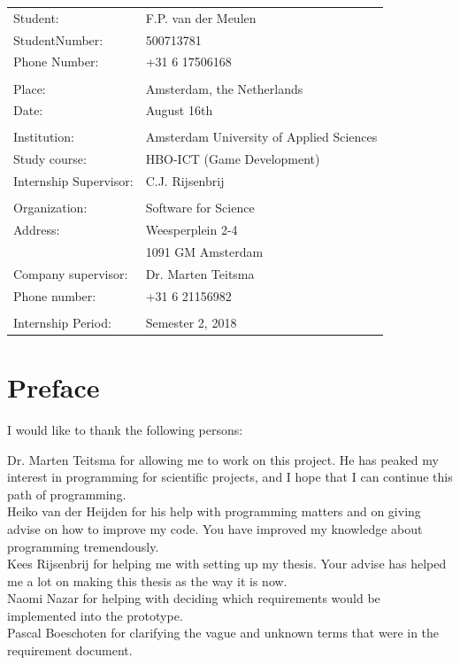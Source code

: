 \documentclass[paper=a4, fontsize=11pt,twoside]{scrartcl}	%
\begin{document}
\newpage 
\begin{longtable}{  p{8cm}  p{8cm} }
Student: & F.P. van der Meulen \\
StudentNumber: & 500713781 \\
Phone Number: & +31 6 17506168 \\
\\
Place: & Amsterdam, the Netherlands \\
Date: & August 16th \\
\\
Institution: & Amsterdam University of Applied Sciences \\
Study course: & HBO-ICT (Game Development) \\
Internship Supervisor: & C.J. Rijsenbrij \\
\\
Organization: & Software for Science \\
Address: & Weesperplein 2-4 \\
 & 1091 GM Amsterdam \\
Company supervisor: & Dr. Marten Teitsma \\
Phone number: & +31 6 21156982\\
\\
Internship Period: & Semester 2, 2018 

\end{longtable}
\newpage



\newpage
\tableofcontents

\newpage
\section*{Preface}
I would like to thank the following persons:

Dr. Marten Teitsma for allowing me to work on this project. He has peaked my interest in programming for scientific projects, and I hope that I can continue this path of programming.\\
Heiko van der Heijden for his help with programming matters and on giving advise on how to improve my code. You have improved my knowledge about programming tremendously. \\
Kees Rijsenbrij for helping me with setting up my thesis. Your advise has helped me a lot on making this thesis as the way it is now. \\
Naomi Nazar for helping with deciding which requirements would be implemented into the prototype. \\
Pascal Boeschoten for clarifying the vague and unknown terms that were in the requirement document.
\end{document}
